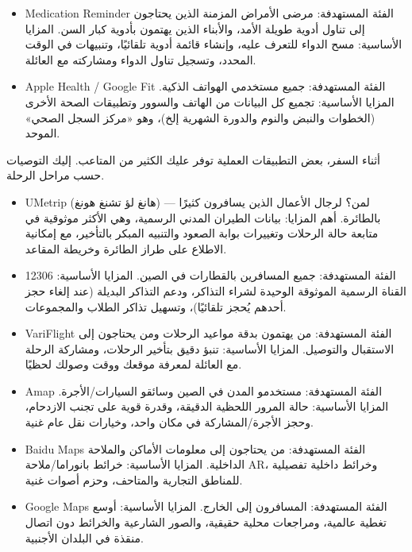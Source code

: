 \begin{itemize}
  \item Medication Reminder الفئة المستهدفة: مرضى الأمراض المزمنة الذين يحتاجون إلى تناول أدوية طويلة الأمد، والأبناء الذين يهتمون بأدوية كبار السن. المزايا الأساسية: مسح الدواء للتعرف عليه، وإنشاء قائمة أدوية تلقائيًا، وتنبيهات في الوقت المحدد، وتسجيل تناول الدواء ومشاركته مع العائلة.
\end{itemize}


\begin{itemize}
  \item Apple Health / Google Fit الفئة المستهدفة: جميع مستخدمي الهواتف الذكية. المزايا الأساسية: تجميع كل البيانات من الهاتف والسوور وتطبيقات الصحة الأخرى (الخطوات والنبض والنوم والدورة الشهرية إلخ)، وهو «مركز السجل الصحي» الموحد.
\end{itemize}


أثناء السفر، بعض التطبيقات العملية توفر عليك الكثير من المتاعب. إليك التوصيات حسب مراحل الرحلة.


\begin{itemize}
  \item UMetrip (هانغ لؤ تشنغ هونغ) — لمن؟ لرجال الأعمال الذين يسافرون كثيرًا بالطائرة. أهم المزايا: بيانات الطيران المدني الرسمية، وهي الأكثر موثوقية في متابعة حالة الرحلات وتغييرات بوابة الصعود والتنبيه المبكر بالتأخير، مع إمكانية الاطلاع على طراز الطائرة وخريطة المقاعد.
  \item 12306 الفئة المستهدفة: جميع المسافرين بالقطارات في الصين. المزايا الأساسية: القناة الرسمية الموثوقة الوحيدة لشراء التذاكر، ودعم التذاكر البديلة (عند إلغاء حجز أحدهم يُحجز تلقائيًا)، وتسهيل تذاكر الطلاب والمجموعات.
  \item VariFlight الفئة المستهدفة: من يهتمون بدقة مواعيد الرحلات ومن يحتاجون إلى الاستقبال والتوصيل. المزايا الأساسية: تنبؤ دقيق بتأخير الرحلات، ومشاركة الرحلة مع العائلة لمعرفة موقعك ووقت وصولك لحظيًا.
\end{itemize}


\begin{itemize}
  \item Amap الفئة المستهدفة: مستخدمو المدن في الصين وسائقو السيارات/الأجرة. المزايا الأساسية: حالة المرور اللحظية الدقيقة، وقدرة قوية على تجنب الازدحام، وحجز الأجرة/المشاركة في مكان واحد، وخيارات نقل عام غنية.
  \item Baidu Maps الفئة المستهدفة: من يحتاجون إلى معلومات الأماكن والملاحة الداخلية. المزايا الأساسية: خرائط بانوراما/ملاحة AR، وخرائط داخلية تفصيلية للمناطق التجارية والمتاحف، وحزم أصوات غنية.
  \item Google Maps الفئة المستهدفة: المسافرون إلى الخارج. المزايا الأساسية: أوسع تغطية عالمية، ومراجعات محلية حقيقية، والصور الشارعية والخرائط دون اتصال منقذة في البلدان الأجنبية.
\end{itemize}


